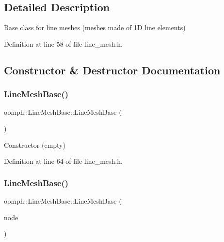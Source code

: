 \subsection{Detailed Description}
Base class for line meshes (meshes made of 1D line elements) 

Definition at line 58 of file line\+\_\+mesh.\+h.



\subsection{Constructor \& Destructor Documentation}
\mbox{\label{classoomph_1_1LineMeshBase_a17ac7e4db35e550c05c12368132b48df}} 
\subsubsection{\texorpdfstring{Line\+Mesh\+Base()}{LineMeshBase()}\hspace{0.1cm}{\footnotesize\ttfamily [1/2]}}
{\footnotesize\ttfamily oomph\+::\+Line\+Mesh\+Base\+::\+Line\+Mesh\+Base (\begin{DoxyParamCaption}{ }\end{DoxyParamCaption})\hspace{0.3cm}{\ttfamily [inline]}}



Constructor (empty) 



Definition at line 64 of file line\+\_\+mesh.\+h.

\mbox{\label{classoomph_1_1LineMeshBase_ae1fc7877845a06c7f23bafdf2fd9954b}} 
\subsubsection{\texorpdfstring{Line\+Mesh\+Base()}{LineMeshBase()}\hspace{0.1cm}{\footnotesize\ttfamily [2/2]}}
{\footnotesize\ttfamily oomph\+::\+Line\+Mesh\+Base\+::\+Line\+Mesh\+Base (\begin{DoxyParamCaption}\item[{const \hyperlink{classoomph_1_1LineMeshBase}{Line\+Mesh\+Base} \&}]{node }\end{DoxyParamCaption})\hspace{0.3cm}{\ttfamily [inline]}}



